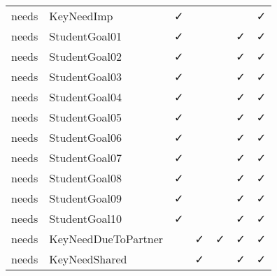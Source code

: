 \begin{table}
\begin{tabular}[t]{llccccc}
needs & KeyNeedImp & ✓ &  &  &  & ✓\\
needs & StudentGoal01 & ✓ &  &  & ✓ & ✓\\
needs & StudentGoal02 & ✓ &  &  & ✓ & ✓\\
\addlinespace
needs & StudentGoal03 & ✓ &  &  & ✓ & ✓\\
needs & StudentGoal04 & ✓ &  &  & ✓ & ✓\\
needs & StudentGoal05 & ✓ &  &  & ✓ & ✓\\
needs & StudentGoal06 & ✓ &  &  & ✓ & ✓\\
needs & StudentGoal07 & ✓ &  &  & ✓ & ✓\\
\addlinespace
needs & StudentGoal08 & ✓ &  &  & ✓ & ✓\\
needs & StudentGoal09 & ✓ &  &  & ✓ & ✓\\
needs & StudentGoal10 & ✓ &  &  & ✓ & ✓\\
needs & KeyNeedDueToPartner &  & ✓ & ✓ & ✓ & ✓\\
needs & KeyNeedShared &  & ✓ &  & ✓ & ✓\\
\bottomrule
\end{tabular}
\end{table}


